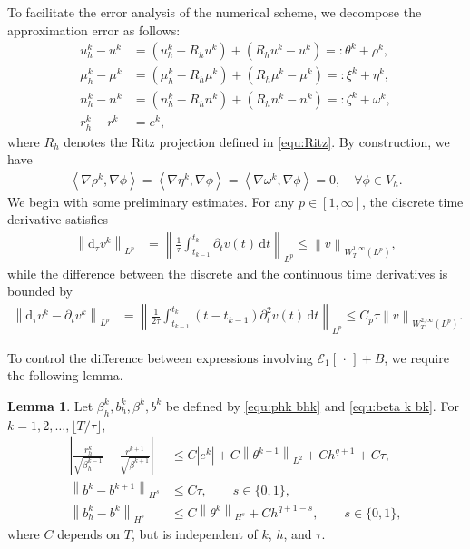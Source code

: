 \documentclass[11pt, reqno]{amsart}
\theoremstyle{definition}
\newtheorem{lemma}[theorem]{Lemma}
\numberwithin{equation}{section}
\newcommand{\dt}{\mathrm{d}t}
\newcommand{\dtt}{\mathrm{d}_\tau}
\newcommand{\norm}[2]{\left\|{#1}\right\|_{#2}}
\newcommand{\inpro}[2]{\left\langle#1,#2\right\rangle}
\newcommand{\abs}[1]{\left|{#1}\right|}
\begin{document}
To facilitate the error analysis of the numerical scheme, we decompose the approximation error as follows:
\begin{align}
	\label{equ:split uk}
	u_h^k-u^k &= (u_h^k -R_h u^k) + (R_h u^k- u^k) =: \theta^k + \rho^k,
	\\
	\label{equ:split mu}
	\mu_h^k-\mu^k &= (\mu_h^k -R_h \mu^k) + (R_h \mu^k- \mu^k) =: \xi^k + {\eta^k},
	\\
	\label{equ:split n}
	n_h^k-n^k &= (n_h^k -R_h n^k) + (R_h n^k- n^k) =: \zeta^k + \omega^k,
	\\
	\label{equ:split rk}
	r_h^k-r^k &= e^k,
\end{align}
where $R_h$ denotes the Ritz projection defined in \eqref{equ:Ritz}. By construction, we have
\begin{align}\label{equ:Ritz zero}
	\inpro{\nabla \rho^k}{\nabla {\phi}} = \inpro{\nabla \eta^k}{\nabla {\phi}} = 
	\inpro{\nabla \omega^k}{\nabla {\phi}} = 0, \quad \forall {\phi}\in V_h.
\end{align}
We begin with some preliminary estimates. For any $p\in [1,\infty]$, the discrete time derivative satisfies
\begin{align}\label{equ:dt vn Lp}
	\norm{\dtt v^k}{L^p}
	&=
	\norm{\frac{1}{\tau} \int_{t_{k-1}}^{t_k} \partial_t v(t) \,\dt}{L^p}
	\leq
	\norm{v}{W^{1,\infty}_T(L^p)},
\end{align}
while the difference between the discrete and the continuous time derivatives is bounded by
\begin{align}
	\label{equ:dt vn min par v}
	\norm{\dtt v^k- \partial_t v^k}{L^p}
	&=
	\norm{\frac{1}{2\tau} \int_{t_{k-1}}^{t_k} (t-t_{k-1}) \partial_t^2 v(t)\,\dt}{L^p}
	\leq 
	C_p \tau \norm{v}{W^{2,\infty}_T(L^p)}.
\end{align}

To control the difference between expressions involving $\mathcal{E}_1[\,\cdot\,]+B$, we require the following lemma.


\begin{lemma}\label{lem:rf frac est}
{Let $\beta_h^k, b_h^k, \beta^k, b^k$ be defined by \eqref{equ:phk bhk} and \eqref{equ:beta k bk}.} For $k=1,2,\ldots, \lfloor T/\tau \rfloor$, 
\begin{align}
	\label{equ:rhk rk frac}
	\abs{\frac{r_h^k}{\sqrt{\beta_h^{k-1}}} - \frac{r^{k+1}}{\sqrt{\beta^{k+1}}}}
	&\leq
	C\abs{e^k} + C\norm{\theta^{k-1}}{L^2} + Ch^{q+1} + C\tau,
	\\[1ex]
	\label{equ:frac rk f min rk1 f}
	\norm{b^k - b^{k+1}}{H^s}
	&\leq
	C\tau, \qquad s\in \{0,1\},
	\\[1ex]
	\label{equ:frac L2 uhk uk}
	\norm{b_h^k - b^k}{H^s}
	&\leq
	C\norm{\theta^k}{H^s} + Ch^{q+1-s}, \qquad s\in \{0,1\},
\end{align}
where $C$ depends on $T$, but is independent of $k$, $h$, and $\tau$.
\end{lemma}
\end{document}
